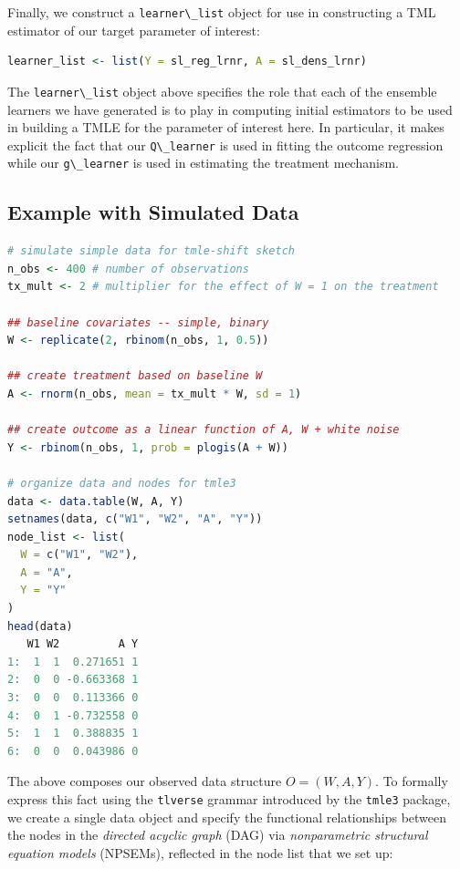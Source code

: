\documentclass[
  12pt, krantz2,
]{krantz}
\newcommand{\passthrough}[1]{#1}
\theoremstyle{definition}
\theoremstyle{definition}
\theoremstyle{definition}
\newcommand{\1}{\mathbbm{1}}
\begin{document}
Finally, we construct a \passthrough{\lstinline!learner\_list!} object for use in constructing a TML
estimator of our target parameter of interest:

\begin{lstlisting}[language=R]
learner_list <- list(Y = sl_reg_lrnr, A = sl_dens_lrnr)
\end{lstlisting}

The \passthrough{\lstinline!learner\_list!} object above specifies the role that each of the ensemble
learners we have generated is to play in computing initial estimators to be
used in building a TMLE for the parameter of interest here. In particular, it
makes explicit the fact that our \passthrough{\lstinline!Q\_learner!} is used in fitting the outcome
regression while our \passthrough{\lstinline!g\_learner!} is used in estimating the treatment mechanism.

\hypertarget{example-with-simulated-data}{%
\subsection{Example with Simulated Data}\label{example-with-simulated-data}}

\begin{lstlisting}[language=R]
# simulate simple data for tmle-shift sketch
n_obs <- 400 # number of observations
tx_mult <- 2 # multiplier for the effect of W = 1 on the treatment

## baseline covariates -- simple, binary
W <- replicate(2, rbinom(n_obs, 1, 0.5))

## create treatment based on baseline W
A <- rnorm(n_obs, mean = tx_mult * W, sd = 1)

## create outcome as a linear function of A, W + white noise
Y <- rbinom(n_obs, 1, prob = plogis(A + W))

# organize data and nodes for tmle3
data <- data.table(W, A, Y)
setnames(data, c("W1", "W2", "A", "Y"))
node_list <- list(
  W = c("W1", "W2"),
  A = "A",
  Y = "Y"
)
head(data)
   W1 W2         A Y
1:  1  1  0.271651 1
2:  0  0 -0.663368 1
3:  0  0  0.113366 0
4:  0  1 -0.732558 0
5:  1  1  0.388835 1
6:  0  0  0.043986 0
\end{lstlisting}

The above composes our observed data structure \(O = (W, A, Y)\). To formally
express this fact using the \passthrough{\lstinline!tlverse!} grammar introduced by the \passthrough{\lstinline!tmle3!} package,
we create a single data object and specify the functional relationships between
the nodes in the \emph{directed acyclic graph} (DAG) via \emph{nonparametric structural
equation models} (NPSEMs), reflected in the node list that we set up:
\end{document}
